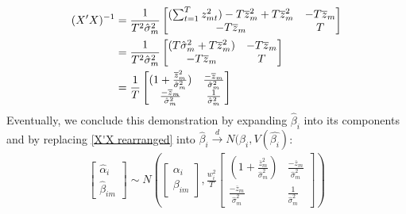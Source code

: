 \documentclass[12pt]{article}
\begin{document}
\begin{align} \label{X'X rearranged}
(X'X)^{-1} &=  \frac{1}{T^2\hat{\sigma}_{m}^2} 
				\begin{bmatrix} (\sum_{t=1}^{T}z_{mt}^2) -T\overline{z}_m^2 + T\overline{z}_m^2 & -T\overline{z}_m \\ -T\overline{z}_m & T \end{bmatrix} \notag \\
			&= 	\frac{1}{T^2\hat{\sigma}_{m}^2}
			    \begin{bmatrix} (T\hat{\sigma}_{m}^2 + T\overline{z}_m^2) & -T\overline{z}_m \\ -T\overline{z}_m & T \end{bmatrix} \notag \\
			&=  \frac{1}{T} 
				\begin{bmatrix} (1 + \frac{\overline{z}_m^2}{\hat{\sigma}_{m}^2}) & \frac{-\overline{z}_m}{\hat{\sigma}_{m}^2} \\ \frac{-\overline{z}_m}{\hat{\sigma}_{m}^2} & \frac{1}{\hat{\sigma}_{m}^2} \end{bmatrix}   
\end{align}
Eventually, we conclude this demonstration by expanding $\hat{\beta}_i$ into its components and by replacing \ref{X'X rearranged} into $\hat{\beta}_i \overset{d}{\to} N(\beta_i,V(\hat{\beta_i})$:
\begin{align}
\begin{bmatrix} \hat{\alpha}_i \\ \hat{\beta}_{im} \end{bmatrix}
\sim N(\begin{bmatrix} \alpha_i \\ \beta_{im} \end{bmatrix}, \frac{w_i^2}{T}\begin{bmatrix} (1 + \frac{\overline{z}_m^2}{\hat{\sigma}_{m}^2}) & \frac{-\overline{z}_m}{\hat{\sigma}_{m}^2} \\ \frac{-\overline{z}_m}{\hat{\sigma}_{m}^2} & \frac{1}{\hat{\sigma}_{m}^2} \end{bmatrix}) 
\end{align}
\end{document}
